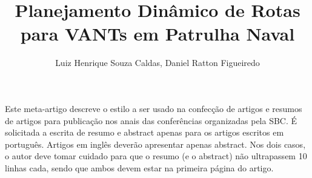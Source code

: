 \documentclass[12pt]{article}
\title{Planejamento Dinâmico de Rotas para VANTs em Patrulha Naval}
\author{Luiz Henrique Souza Caldas\inst{1}, Daniel Ratton Figueiredo\inst{1}}
\begin{document}
 

\maketitle
     
\begin{resumo} 
  Este meta-artigo descreve o estilo a ser usado na confecção de artigos e
  resumos de artigos para publicação nos anais das conferências organizadas
  pela SBC. É solicitada a escrita de resumo e abstract apenas para os artigos
  escritos em português. Artigos em inglês deverão apresentar apenas abstract.
  Nos dois casos, o autor deve tomar cuidado para que o resumo (e o abstract)
  não ultrapassem 10 linhas cada, sendo que ambos devem estar na primeira
  página do artigo.
\end{resumo}










\end{document}
